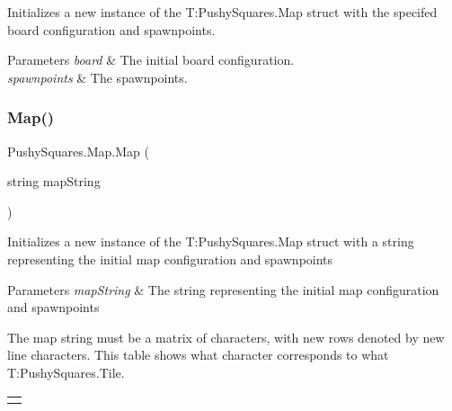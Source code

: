 Initializes a new instance of the T\+:\+Pushy\+Squares.\+Map struct with the specifed board configuration and spawnpoints. 


\begin{DoxyParams}{Parameters}
{\em board} & The initial board configuration.\\
\hline
{\em spawnpoints} & The spawnpoints.\\
\hline
\end{DoxyParams}
\mbox{\label{struct_pushy_squares_1_1_map_a2bc179f99cc9b1d592a249a3dc83e2c4}} 
\subsubsection{\texorpdfstring{Map()}{Map()}\hspace{0.1cm}{\footnotesize\ttfamily [2/2]}}
{\footnotesize\ttfamily Pushy\+Squares.\+Map.\+Map (\begin{DoxyParamCaption}\item[{string}]{map\+String }\end{DoxyParamCaption})}



Initializes a new instance of the T\+:\+Pushy\+Squares.\+Map struct with a string representing the initial map configuration and spawnpoints 


\begin{DoxyParams}{Parameters}
{\em map\+String} & The string representing the initial map configuration and spawnpoints\\
\hline
\end{DoxyParams}


The map string must be a matrix of characters, with new rows denoted by new line characters. This table shows what character corresponds to what T\+:\+Pushy\+Squares.\+Tile. \tabulinesep=1mm
\begin{longtabu} spread 0pt [c]{*{0}{|X[-1]}|}
\hline
\\
\end{longtabu}

